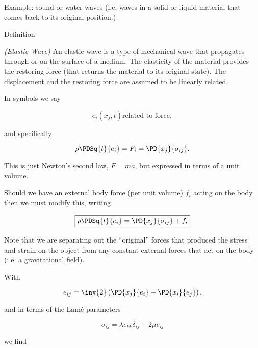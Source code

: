 Example: sound or water waves (i.e. waves in a solid or liquid material that comes back to its original position.)

Definition
\begin{definition}
\emph{(Elastic Wave)}
\label{dfn:continuumL6:10}
An elastic wave is a type of mechanical wave that propagates through or on the surface of a medium.  The elasticity of the material provides the restoring force (that returns the material to its original state).  The displacement and the restoring force are assumed to be linearly related.
\end{definition}

In symbols we say

\begin{equation}\label{eqn:continuumL6:130}
e_i(x_j, t) \mbox{related to force},
\end{equation}

and specifically

\begin{equation}\label{eqn:continuumL6:150}
\rho \PDSq{t}{e_i} = F_i = \PD{x_j}{\sigma_{ij}}.
\end{equation}

This is just Newton's second law, $F = ma$, but expressed in terms of a unit volume.

Should we have an external body force (per unit volume) $f_i$ acting on the body then we must modify this, writing

\begin{equation}\label{eqn:continuumL6:170}
\boxed{
\rho \PDSq{t}{e_i} = \PD{x_j}{\sigma_{ij}} + f_i
}
\end{equation}

Note that we are separating out the ``original'' forces that produced the stress and strain on the object from any constant external forces that act on the body (i.e. a gravitational field).

With 

\begin{equation}\label{eqn:continuumL6:190}
e_{ij} = 
\inv{2} \left( 
\PD{x_j}{e_i}
+ \PD{x_i}{e_j} \right),
\end{equation}

and in terms of the Lam\'e parameters

\begin{equation}\label{eqn:continuumL6:210}
\sigma_{ij} = \lambda e_{kk} \delta_{ij} + 2 \mu e_{ij}
\end{equation}

we find

